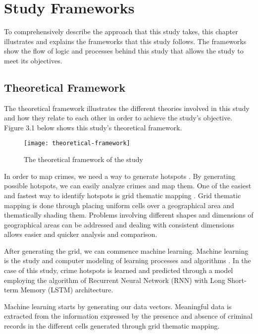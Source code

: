 \chapter{Study Frameworks}
    To comprehensively describe the approach that this study takes, this chapter illustrates and explains the frameworks that this study follows. The frameworks show the flow of logic and processes behind this study that allows the study to meet its objectives.
\section{Theoretical Framework}

The theoretical framework illustrates the different theories involved in this study and how they relate to each other in order to achieve the study's objective. Figure 3.1 below shows this study's theoretical framework.
\begin{figure}[H]
    \centering
    \texttt{[image: theoretical-framework]}
    \caption{The theoretical framework of the study}
\end{figure}
In order to map crimes, we need a way to generate hotspots \citep{eck2005mapping}. By generating possible hotspots, we can easily analyze crimes and map them. One of the easiest and fastest way to identify hotspots is grid thematic mapping \citep{chainey2008utility}. Grid thematic mapping is done through placing uniform cells over a geographical area and thematically shading them. Problems involving different shapes and dimensions of geographical areas can be addressed and dealing with consistent dimensions allows easier and quicker analysis and comparison.

After generating the grid, we can commence machine learning. Machine learning is the study and computer modeling of learning processes and algorithms \citep{michalski2013machine}. In the case of this study, crime hotspots is learned and predicted through a model employing the algorithm of Recurrent Neural Network (RNN) with Long Short-term Memory (LSTM) architecture. 

Machine learning starts by generating our data vectors. Meaningful data is extracted from the information expressed by the presence and absence of criminal records in the different cells generated through grid thematic mapping.


